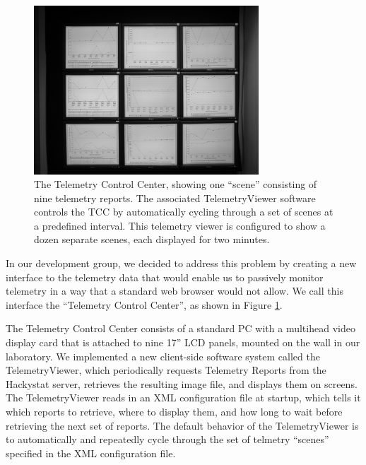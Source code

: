 \documentclass[11pt,twocolumn]{article}
\begin{document}
\begin{figure}[ht]
  \centering
  \includegraphics[width=0.75\textwidth]{Wall.eps}

  \caption{The Telemetry Control Center, showing one ``scene'' consisting
  of nine telemetry reports. The associated TelemetryViewer software 
  controls the TCC by automatically cycling
  through a set of scenes at a predefined interval. This 
  telemetry viewer is configured to show a dozen separate
  scenes, each displayed for two minutes.  }
  \label{fig:telemetrycontrolcenter}
\end{figure}

In our development group, we decided to address this problem by creating a
new interface to the telemetry data that would enable us to passively
monitor telemetry in a way that a standard web browser would not allow. We
call this interface the ``Telemetry Control Center'', as shown in Figure
\ref{fig:telemetrycontrolcenter}.  

The Telemetry Control Center consists of a standard PC with a multihead
video display card that is attached to nine 17'' LCD panels, mounted on the
wall in our laboratory.  We implemented a new client-side software system
called the TelemetryViewer, which periodically requests Telemetry Reports
from the Hackystat server, retrieves the resulting image file, and displays
them on screens.  The TelemetryViewer reads in an XML configuration file at
startup, which tells it which reports to retrieve, where to display them,
and how long to wait before retrieving the next set of reports. The default
behavior of the TelemetryViewer is to automatically and repeatedly cycle
through the set of telmetry ``scenes'' specified in the XML configuration
file.
\end{document}

